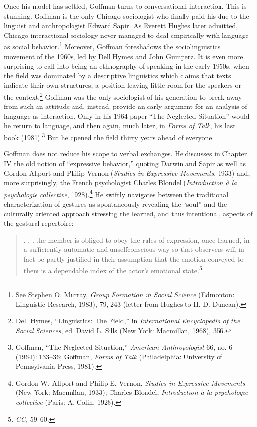 \documentclass[twoside,symmetric,nobib,justified]{tufte-book}
\begin{document}
Once his model has settled, Goffman turns to conversational interaction.
This is stunning. Goffman is the only Chicago sociologist who finally
paid his due to the linguist and anthropologist Edward Sapir. As Everett
Hughes later admitted, Chicago interactional sociology never managed to
deal empirically with language as social behavior.\footnote{See Stephen
  O. Murray, \emph{Group Formation in Social Science} (Edmonton:
  Linguistic Research, 1983), 79, 243 (letter from Hughes to H. D.
  Duncan).} Moreover, Goffman foreshadows the sociolinguistics movement
of the 1960s, led by Dell Hymes and John Gumperz. It is even more
surprising to call into being an ethnography of speaking in the early
1950s, when the field was dominated by a descriptive linguistics which
claims that texts indicate their own structures, a position leaving
little room for the speakers or the context.\footnote{Dell Hymes,
  ``Linguistics: The Field,'' in \emph{International Encyclopedia of the
  Social Sciences}, ed. David L. Sills (New York: Macmillan, 1968), 356.}
Goffman was the only sociologist of his generation to break away from
such an attitude and, instead, provide an early argument for an analysis
of language as interaction. Only in his 1964 paper ``The Neglected
Situation'' would he return to language, and then again, much later, in
\emph{Forms of Talk}, his last book (1981).\footnote{Goffman, ``The
  Neglected Situation,'' \emph{American Anthropologist} 66, no. 6
  (1964): 133--36; Goffman, \emph{Forms of Talk} (Philadelphia:
  University of Pennsylvania Press, 1981).} But he opened the field
thirty years ahead of everyone.

Goffman does not reduce his scope to verbal exchanges. He discusses in
Chapter IV the old notion of ``expressive behavior,'' quoting Darwin and
Sapir as well as Gordon Allport and Philip Vernon (\emph{Studies in
Expressive Movements}, 1933) and, more surprisingly, the French
psychologist Charles Blondel (\emph{Introduction à la psychologie
collective}, 1928).\footnote{Gordon W. Allport and Philip E. Vernon,
  \emph{Studies in Expressive Movements} (New York: Macmillan, 1933);
  Charles Blondel, \emph{Introduction à la psychologie collective}
  (Paris: A. Colin, 1928).} He swiftly navigates between the traditional
characterization of gestures as spontaneously revealing the ``soul'' and
the culturally oriented approach stressing the learned, and thus
intentional, aspects of the gestural repertoire:

\begin{quote}
. . . the member is obliged to obey the rules of expression, once
learned, in a sufficiently automatic and unselfconscious way so that
observers will in fact be partly justified in their assumption that the
emotion conveyed to them is a dependable index of the actor's emotional
state.\footnote{\emph{CC,} 59--60.}
\end{quote}
\end{document}
